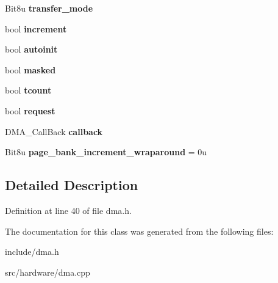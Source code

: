 \begin{DoxyCompactItemize}
\item 
\hypertarget{classDmaChannel_a1ff8f265195cc49d623bf3b4e1f9cc51}{Bit8u {\bfseries transfer\-\_\-mode}}\label{classDmaChannel_a1ff8f265195cc49d623bf3b4e1f9cc51}

\item 
\hypertarget{classDmaChannel_a462fde087b93bc0172eae96bfac4cb78}{bool {\bfseries increment}}\label{classDmaChannel_a462fde087b93bc0172eae96bfac4cb78}

\item 
\hypertarget{classDmaChannel_ad70005267377fb3829595928fc400f9a}{bool {\bfseries autoinit}}\label{classDmaChannel_ad70005267377fb3829595928fc400f9a}

\item 
\hypertarget{classDmaChannel_ad24be4e9ff88231234910ea3ee1eec2d}{bool {\bfseries masked}}\label{classDmaChannel_ad24be4e9ff88231234910ea3ee1eec2d}

\item 
\hypertarget{classDmaChannel_a2e4fad930477a7c01aa3fa99ab621cb9}{bool {\bfseries tcount}}\label{classDmaChannel_a2e4fad930477a7c01aa3fa99ab621cb9}

\item 
\hypertarget{classDmaChannel_a5c77231af669e0e07bbfe6312c19bcd5}{bool {\bfseries request}}\label{classDmaChannel_a5c77231af669e0e07bbfe6312c19bcd5}

\item 
\hypertarget{classDmaChannel_a41e670fcadb263b920f0a4bd86c044b2}{D\-M\-A\-\_\-\-Call\-Back {\bfseries callback}}\label{classDmaChannel_a41e670fcadb263b920f0a4bd86c044b2}

\item 
\hypertarget{classDmaChannel_ae139ade8199f7d7dce6f2031578cb59c}{Bit8u {\bfseries page\-\_\-bank\-\_\-increment\-\_\-wraparound} = 0u}\label{classDmaChannel_ae139ade8199f7d7dce6f2031578cb59c}

\end{DoxyCompactItemize}


\subsection{Detailed Description}


Definition at line 40 of file dma.\-h.



The documentation for this class was generated from the following files\-:\begin{DoxyCompactItemize}
\item 
include/dma.\-h\item 
src/hardware/dma.\-cpp\end{DoxyCompactItemize}
